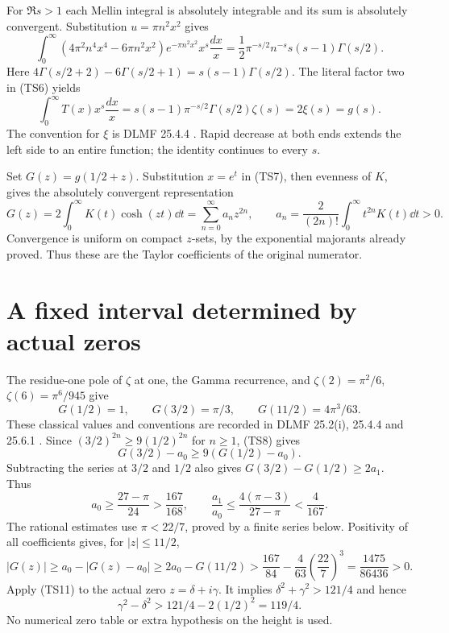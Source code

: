 \documentclass[11pt,a4paper]{article}
\begin{document}
For $\Re s>1$ each Mellin integral is absolutely integrable and its
sum is absolutely convergent. Substitution $u=\pi n^2x^2$ gives
\[
 \int_0^\infty(4\pi^2n^4x^4-6\pi n^2x^2)e^{-\pi n^2x^2}x^s\frac{dx}{x}
 =\frac12\pi^{-s/2}n^{-s}s(s-1)\Gamma(s/2).
\]
Here $4\Gamma(s/2+2)-6\Gamma(s/2+1)=s(s-1)\Gamma(s/2)$.
The literal factor two in (TS6) yields
\begin{equation}\tag{TS7}
 \int_0^\infty T(x)x^s\frac{dx}{x}
 =s(s-1)\pi^{-s/2}\Gamma(s/2)\zeta(s)=2\xi(s)=g(s).
\end{equation}
The convention for $\xi$ is DLMF 25.4.4 \cite{a02ts:zeta}.
Rapid decrease at both ends extends the left side to an entire
function; the identity continues to every $s$.

Set $G(z)=g(1/2+z)$. Substitution $x=e^t$ in (TS7), then evenness
of $K$, gives the absolutely convergent representation
\begin{equation}\tag{TS8}
 G(z)=2\int_0^\infty K(t)\cosh(zt)\dd t
 =\sum_{n=0}^\infty a_nz^{2n},\qquad
 a_n=\frac2{(2n)!}\int_0^\infty t^{2n}K(t)\dd t>0.
\end{equation}
Convergence is uniform on compact $z$-sets, by the exponential
majorants already proved. Thus these are the Taylor coefficients
of the original numerator.

\section{A fixed interval determined by actual zeros}
The residue-one pole of $\zeta$ at one, the Gamma recurrence, and
$\zeta(2)=\pi^2/6$, $\zeta(6)=\pi^6/945$ give
\begin{equation}\tag{TS9}
 G(1/2)=1,\qquad G(3/2)=\pi/3,\qquad G(11/2)=4\pi^3/63.
\end{equation}
These classical values and conventions are recorded in DLMF
25.2(i), 25.4.4 and 25.6.1 \cite{a02ts:zeta,a02ts:zetavalues}.
Since $(3/2)^{2n}\geq9(1/2)^{2n}$ for $n\geq1$, (TS8) gives
\[
 G(3/2)-a_0\geq9(G(1/2)-a_0).
\]
Subtracting the series at $3/2$ and $1/2$ also gives
$G(3/2)-G(1/2)\geq2a_1$. Thus
\begin{equation}\tag{TS10}
 a_0\geq\frac{27-\pi}{24}>\frac{167}{168},\qquad
 \frac{a_1}{a_0}\leq\frac{4(\pi-3)}{27-\pi}<\frac4{167}.
\end{equation}
The rational estimates use $\pi<22/7$, proved by a finite series
below. Positivity of all coefficients gives, for $|z|\leq11/2$,
\begin{equation}\tag{TS11}
 |G(z)|\geq a_0-|G(z)-a_0|
 \geq2a_0-G(11/2)
 >\frac{167}{84}-\frac4{63}\left(\frac{22}{7}\right)^3
 =\frac{1475}{86436}>0.
\end{equation}
Apply (TS11) to the actual zero $z=\delta+i\gamma$. It implies
$\delta^2+\gamma^2>121/4$ and hence
\begin{equation}\tag{TS12}
 \gamma^2-\delta^2>121/4-2(1/2)^2=119/4.
\end{equation}
No numerical zero table or extra hypothesis on the height is used.
\end{document}
